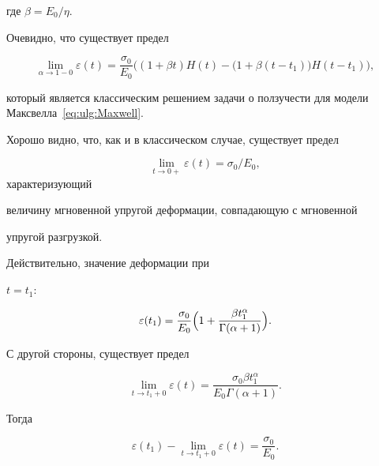 где $\beta=E_{0}/\eta$.



Очевидно, что существует предел

$$

\displaystyle\lim_{\alpha\to1-0}\varepsilon(t)=\frac{\sigma_{0}}{E_{0}}

\bigl((1+\beta t)H(t)-\bigl(1+\beta(t-t_{1})\bigr)H(t-t_{1})\bigr),

$$

который является классическим решением задачи о ползучести для модели Максвелла~\eqref{eq:ulg:Maxwell}.



Хорошо видно, что, как и в классическом случае, существует предел

$$\lim_{t\to 0+}\varepsilon(t)=\sigma_{0}/E_{0},$$ характеризующий

величину мгновенной упругой деформации, совпадающую с мгновенной

упругой разгрузкой. 

Действительно, значение деформации при

$t=t_{1}$:

\begin{equation*}

\varepsilon(t_{1})=\frac{\sigma_{0}}{E_{0}}\Bigl(1+\frac{\beta

t_{1}^{\alpha}}{ \Gamma (\alpha+1)}\Bigr).

\end{equation*}



С другой стороны, существует предел

\begin{equation*}

\lim\limits_{t\rightarrow

t_{1}+0}\varepsilon(t)=\frac{\sigma_{0}\beta

t_{1}^{\alpha}}{E_{0} \Gamma (\alpha+1)}.

\end{equation*}

Тогда

\begin{equation*}

\varepsilon(t_{1})-\lim\limits_{t\rightarrow

t_{1}+0}\varepsilon(t)=\frac{\sigma_{0}}{E_{0}}.

\end{equation*}



\smallskip



